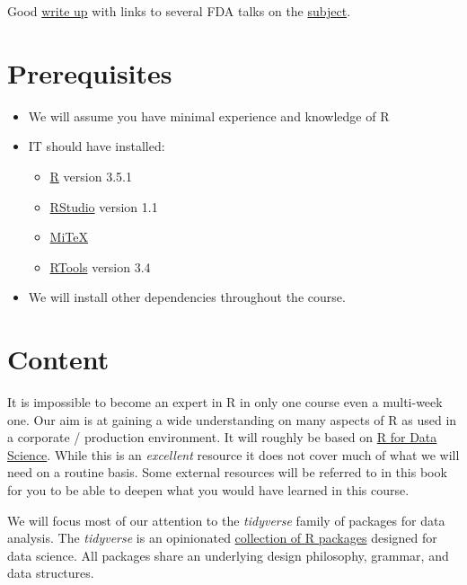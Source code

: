 \documentclass[]{book}
\providecommand{\tightlist}{%
  \setlength{\itemsep}{0pt}\setlength{\parskip}{0pt}}
\theoremstyle{definition}
\theoremstyle{definition}
\theoremstyle{definition}
\theoremstyle{remark}
\begin{document}
Good \href{http://blog.revolutionanalytics.com/2017/06/r-fda.html}{write
up} with links to several FDA talks on the
\href{https://thomaswdinsmore.com/2014/12/01/sas-versus-r-part-1/}{subject}.

\section{Prerequisites}\label{prerequisites}

\begin{itemize}
\tightlist
\item
  We will assume you have minimal experience and knowledge of R
\item
  IT should have installed:

  \begin{itemize}
  \tightlist
  \item
    \href{https://cran.r-project.org/}{R} version 3.5.1
  \item
    \href{https://www.rstudio.com/products/rstudio/download/\#download}{RStudio}
    version 1.1
  \item
    \href{https://miktex.org/}{MiTeX}
  \item
    \href{https://cran.r-project.org/bin/windows/Rtools/}{RTools}
    version 3.4
  \end{itemize}
\item
  We will install other dependencies throughout the course.
\end{itemize}

\section{Content}\label{content}

It is impossible to become an expert in R in only one course even a
multi-week one. Our aim is at gaining a wide understanding on many
aspects of R as used in a corporate / production environment. It will
roughly be based on \href{http://r4ds.had.co.nz}{R for Data Science}.
While this is an \emph{excellent} resource it does not cover much of
what we will need on a routine basis. Some external resources will be
referred to in this book for you to be able to deepen what you would
have learned in this course.

We will focus most of our attention to the \emph{tidyverse} family of
packages for data analysis. The \emph{tidyverse} is an opinionated
\href{https://www.tidyverse.org/packages/}{collection of R packages}
designed for data science. All packages share an underlying design
philosophy, grammar, and data structures.
\end{document}
